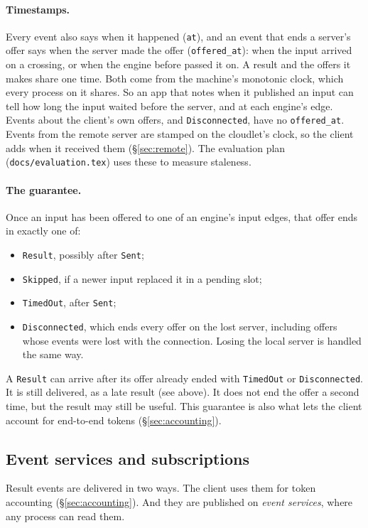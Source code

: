 \documentclass[11pt]{article}
\newcommand{\code}[1]{\texttt{#1}}
\begin{document}
\paragraph{Timestamps.} Every event also says when it happened (\code{at}),
and an event that ends a server's offer says when the server made the offer
(\code{offered\_at}): when the input arrived on a crossing, or when the
engine before passed it on. A result and the offers it makes share one time.
Both come from the machine's monotonic clock, which every process on it
shares. So an app that notes when it published an input can tell how long the
input waited before the server, and at each engine's edge. Events about the
client's own offers, and \code{Disconnected}, have no \code{offered\_at}.
Events from the remote server are stamped on the cloudlet's clock, so the
client adds when it received them (\S\ref{sec:remote}). The
evaluation plan (\code{docs/evaluation.tex}) uses these to measure staleness.

\paragraph{The guarantee.} Once an input has been offered to one of an
engine's input edges, that offer ends in exactly one of:
\begin{itemize}[nosep]
  \item \code{Result}, possibly after \code{Sent};
  \item \code{Skipped}, if a newer input replaced it in a pending slot;
  \item \code{TimedOut}, after \code{Sent};
  \item \code{Disconnected}, which ends every offer on the lost server,
        including offers whose events were lost with the connection. Losing
        the local server is handled the same way.
\end{itemize}
A \code{Result} can arrive after its offer already ended with \code{TimedOut}
or \code{Disconnected}. It is still delivered, as a late result (see above). It
does not end the offer a second time, but the result may still be useful. This
guarantee is also what lets the client account for end-to-end tokens
(\S\ref{sec:accounting}).

\subsection{Event services and subscriptions}
\label{sec:subscribe}

Result events are delivered in two ways. The client uses them for token
accounting (\S\ref{sec:accounting}). And they are published on \emph{event
services}, where any process can read them.
\end{document}
